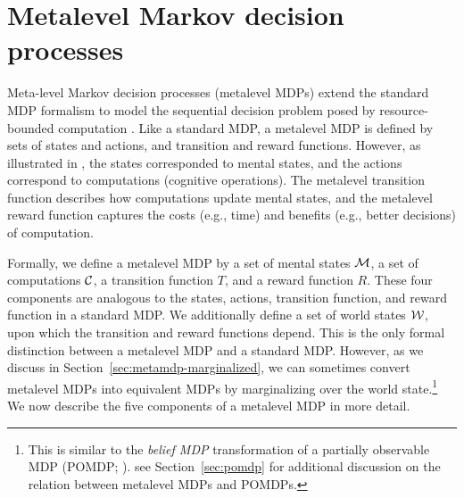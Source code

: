 \section{Metalevel Markov decision processes}\label{sec:metalevel-mdps}


Meta-level Markov decision processes (metalevel MDPs) extend the standard MDP formalism to model the sequential decision problem posed by resource-bounded computation \citep{hay2012selecting}. Like a standard MDP, a metalevel MDP is defined by sets of states and actions, and transition and reward functions. However, as illustrated in , the states corresponded to mental states, and the actions correspond to computations (cognitive operations). The metalevel transition function describes how computations update mental states, and the metalevel reward function captures the costs (e.g., time) and benefits (e.g., better decisions) of computation.

Formally, we define a metalevel MDP by a set of mental states $\mathcal{M}$, a set of computations $\mathcal{C}$, a transition function $T$, and a reward function $R$. These four components are analogous to the states, actions, transition function, and reward function in a standard MDP. We additionally define a set of world states $\mathcal{W}$, upon which the transition and reward functions depend. This is the only formal distinction between a metalevel MDP and a standard MDP. However, as we discuss in Section~\ref{sec:metamdp-marginalized}, we can sometimes convert metalevel MDPs into equivalent MDPs by marginalizing over the world state.\footnote{%
  This is similar to the \emph{belief MDP} transformation of a partially observable MDP (POMDP; \citealp{kaelbling1998planningb}). see Section~\ref{sec:pomdp} for additional discussion on the relation between metalevel MDPs and POMDPs.
} We now describe the five components of a metalevel MDP in more detail.



